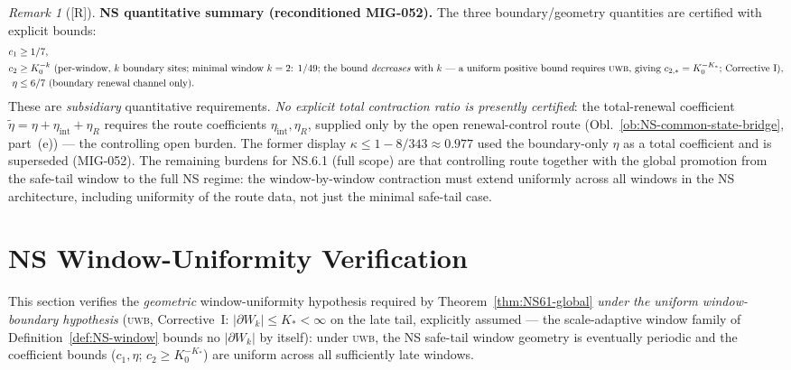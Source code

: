 \documentclass[12pt,oneside]{amsbook}
\theoremstyle{plain}
\theoremstyle{definition}
\theoremstyle{remark}
\newtheorem{remark}[theorem]{Remark}
\newcommand{\status}[1]{\textup{[#1]}}
\begin{document}
\begin{remark}[\status{R}]
\textbf{NS quantitative summary (reconditioned MIG-052).}
The three boundary/geometry quantities are certified with explicit
bounds:
\begin{align*}
 c_1 &\geq 1/7, \\
 c_2 &\geq K_0^{-k} \text{ (per-window, $k$ boundary sites;
 minimal window $k=2$: $1/49$; the bound \emph{decreases} with
 $k$ --- a uniform positive bound requires \textsc{uwb}, giving
 $c_{2,*} = K_0^{-K_*}$; Corrective~I)}, \\
 \eta &\leq 6/7 \text{ (boundary renewal channel only)}.
\end{align*}
These are \emph{subsidiary} quantitative requirements. \emph{No
explicit total contraction ratio is presently certified}: the
total-renewal coefficient
$\widetilde\eta = \eta + \eta_{\mathrm{int}} + \eta_R$
requires the route coefficients $\eta_{\mathrm{int}}, \eta_R$,
supplied only by the open renewal-control route
(Obl.~\ref{ob:NS-common-state-bridge}, part~(e)) --- the
controlling open burden. The former display
$\kappa \leq 1-8/343 \approx 0.977$ used the boundary-only
$\eta$ as a total coefficient and is superseded (MIG-052). The
remaining burdens for NS.6.1 (full scope) are that controlling
route together with the global promotion from the safe-tail window
to the full NS regime: the window-by-window contraction must extend
uniformly across all windows in the NS architecture, including
uniformity of the route data, not just the minimal safe-tail case.
\end{remark}

\section{NS Window-Uniformity Verification}
\label{sec:ns-window-uniformity}

This section verifies the \emph{geometric} window-uniformity
hypothesis required by Theorem~\ref{thm:NS61-global} \emph{under
the uniform window-boundary hypothesis} (\textsc{uwb},
Corrective~I: $|\partial W_k| \leq K_* < \infty$ on the late
tail, explicitly assumed --- the scale-adaptive window family of
Definition~\ref{def:NS-window} bounds no $|\partial W_k|$ by
itself): under \textsc{uwb}, the NS safe-tail window geometry is
eventually periodic and the coefficient bounds ($c_1, \eta$;
$c_2 \geq K_0^{-K_*}$) are uniform across all sufficiently late
windows.
\end{document}
